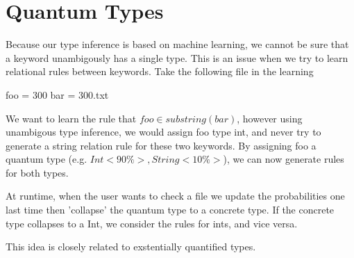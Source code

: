 \section{Quantum Types}

Because our type inference is based on machine learning, we cannot be sure that a keyword unambigously has a single type.
This is an issue when we try to learn relational rules between keywords. 
Take the following file in the learning

foo = 300
bar = 300.txt


We want to learn the rule that $foo \in {substring(bar)}$, however using unambigous type inference, we would assign foo type int, and never try to generate a string relation rule for these two keywords.
By assigning foo a quantum type (e.g. ${Int <90\%>, String <10\%>}$), we can now generate rules for both types.

At runtime, when the user wants to check a file we update the probabilities one last time then 'collapse' the quantum type to a concrete type.
If the concrete type collapses to a Int, we consider the rules for ints, and vice versa.

This idea is closely related to exstentially quantified types.
